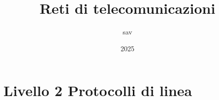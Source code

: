 \documentclass{report}
\title{Reti di telecomunicazioni}
\author{sav}
\date{2025}
\begin{document}
\maketitle
\tableofcontents


%


%

%

%

\chapter{Livello 2 Protocolli di linea}
%

\end{document}
